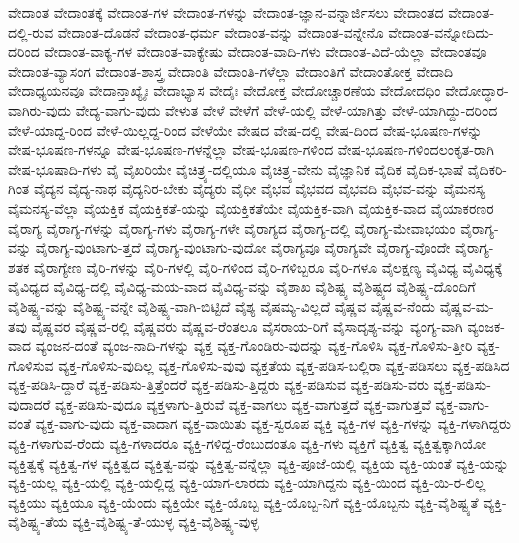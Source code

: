 {ವೇದಾಂತ
ವೇದಾಂತಕ್ಕೆ
ವೇದಾಂತ-ಗಳ
ವೇದಾಂತ-ಗಳನ್ನು
ವೇದಾಂತ-ಜ್ಞಾನ-ವನ್ನಾರ್ಜಿಸಲು
ವೇದಾಂತದ
ವೇದಾಂತ-ದಲ್ಲಿ-ರುವ
ವೇದಾಂತ-ದೊಡನೆ
ವೇದಾಂತ-ಧರ್ಮ
ವೇದಾಂತ-ವನ್ನು
ವೇದಾಂತ-ವನ್ನೇನೊ
ವೇದಾಂತ-ವನ್ನೋದಿದು-ದರಿಂದ
ವೇದಾಂತ-ವಾಕ್ಯ-ಗಳ
ವೇದಾಂತ-ವಾಕ್ಯೇಷು
ವೇದಾಂತ-ವಾದಿ-ಗಳು
ವೇದಾಂತ-ವಿದೆ-ಯೆಲ್ಲಾ
ವೇದಾಂತವೂ
ವೇದಾಂತ-ವ್ಯಾಸಂಗ
ವೇದಾಂತ-ಶಾಸ್ತ್ರ
ವೇದಾಂತಿ
ವೇದಾಂತಿ-ಗಳೆಲ್ಲಾ
ವೇದಾಂತಿಗೆ
ವೇದಾಂತೋಕ್ತ
ವೇದಾದಿ
ವೇದಾಧ್ಯಯನವೂ
ವೇದಾನ್ತಾಖ್ಯೈಃ
ವೇದಾಭ್ಯಾಸ
ವೇದೈಃ
ವೇದೋಕ್ತ
ವೇದೋಚ್ಚಾರಣೆಯ
ವೇದೋದಧಿಂ
ವೇದೋದ್ಧಾರ-ವಾಗಿರು-ವುದು
ವೇದ್ಯ-ವಾಗು-ವುದು
ವೇಳುತ
ವೇಳೆ
ವೇಳೆಗೆ
ವೇಳೆ-ಯಲ್ಲಿ
ವೇಳೆ-ಯಾಗಿತ್ತು
ವೇಳೆ-ಯಾಗಿದ್ದು-ದರಿಂದ
ವೇಳೆ-ಯಾದ್ದ-ರಿಂದ
ವೇಳೆ-ಯಿಲ್ಲದ್ದ-ರಿಂದ
ವೇಳೆಯೇ
ವೇಷದ
ವೇಷ-ದಲ್ಲಿ
ವೇಷ-ದಿಂದ
ವೇಷ-ಭೂಷಣ-ಗಳನ್ನು
ವೇಷ-ಭೂಷಣ-ಗಳನ್ನೂ
ವೇಷ-ಭೂಷಣ-ಗಳನ್ನೆಲ್ಲಾ
ವೇಷ-ಭೂಷಣ-ಗಳಿಂದ
ವೇಷ-ಭೂಷಣ-ಗಳಿಂದಲಂಕೃತ-ರಾಗಿ
ವೇಷ-ಭೂಷಾದಿ-ಗಳು
ವೈ
ವೈಖರಿಯೇ
ವೈಚಿತ್ರ್ಯ-ದಲ್ಲಿಯೂ
ವೈಚಿತ್ರ್ಯ-ವೇನು
ವೈಜ್ಞಾನಿಕ
ವೈದಿಕ
ವೈದಿಕ-ಭಾಷೆ
ವೈದಿಕರಿ-ಗಿಂತ
ವೈದ್ಯನ
ವೈದ್ಯ-ನಾಥ
ವೈದ್ಯನಿರ-ಬೇಕು
ವೈದ್ಯರು
ವೈಧೀ
ವೈಭವ
ವೈಭವದ
ವೈಭವದಿ
ವೈಭವ-ವನ್ನು
ವೈಮನಸ್ಯ
ವೈಮನಸ್ಯ-ವೆಲ್ಲಾ
ವೈಯಕ್ತಿಕ
ವೈಯಕ್ತಿಕತೆ-ಯನ್ನು
ವೈಯಕ್ತಿಕತೆಯೇ
ವೈಯಕ್ತಿಕ-ವಾಗಿ
ವೈಯಕ್ತಿಕ-ವಾದ
ವೈಯಾಕರಣರ
ವೈರಾಗ್ಯ
ವೈರಾಗ್ಯ-ಗಳನ್ನು
ವೈರಾಗ್ಯ-ಗಳು
ವೈರಾಗ್ಯ-ಗಳೇ
ವೈರಾಗ್ಯದ
ವೈರಾಗ್ಯ-ದಲ್ಲಿ
ವೈರಾಗ್ಯ-ಮೇವಾಭಯಂ
ವೈರಾಗ್ಯ-ವನ್ನು
ವೈರಾಗ್ಯ-ವುಂಟಾಗು-ತ್ತದೆ
ವೈರಾಗ್ಯ-ವುಂಟಾಗು-ವುದೋ
ವೈರಾಗ್ಯವೂ
ವೈರಾಗ್ಯವೇ
ವೈರಾಗ್ಯ-ವೊಂದೇ
ವೈರಾಗ್ಯ-ಶತಕ
ವೈರಾಗ್ಯೇಣ
ವೈರಿ-ಗಳನ್ನು
ವೈರಿ-ಗಳಲ್ಲಿ
ವೈರಿ-ಗಳಿಂದ
ವೈರಿ-ಗಳಿಬ್ಬರೂ
ವೈರಿ-ಗಳೂ
ವೈಲಕ್ಷಣ್ಯ
ವೈವಿಧ್ಯ
ವೈವಿಧ್ಯಕ್ಕೆ
ವೈವಿಧ್ಯದ
ವೈವಿಧ್ಯ-ದಲ್ಲಿ
ವೈವಿಧ್ಯ-ಮಯ-ವಾದ
ವೈವಿಧ್ಯ-ವನ್ನು
ವೈಶಾಖ
ವೈಶಿಷ್ಟ್ಯ
ವೈಶಿಷ್ಟ್ಯದ
ವೈಶಿಷ್ಟ್ಯ-ದೊಂದಿಗೆ
ವೈಶಿಷ್ಟ್ಯ-ವನ್ನು
ವೈಶಿಷ್ಟ್ಯ-ವನ್ನೇ
ವೈಶಿಷ್ಟ್ಯ-ವಾಗಿ-ಬಿಟ್ಟಿದೆ
ವೈಶ್ಯ
ವೈಷಮ್ಯ-ವಿಲ್ಲದೆ
ವೈಷ್ಣವ
ವೈಷ್ಣವ-ನೆಂದು
ವೈಷ್ಣವ-ಮ-ತವು
ವೈಷ್ಣವರ
ವೈಷ್ಣವ-ರಲ್ಲಿ
ವೈಷ್ಣವರು
ವೈಷ್ಣವ-ರೆಂತಲೂ
ವೈಸರಾಯ-ರಿಗೆ
ವೈಸಾದೃಶ್ಯ-ವನ್ನು
ವ್ಯಂಗ್ಯ-ವಾಗಿ
ವ್ಯಂಜಕ-ವಾದ
ವ್ಯಂಜನ-ದಂತೆ
ವ್ಯಂಜ-ನಾದಿ-ಗಳನ್ನು
ವ್ಯಕ್ತ
ವ್ಯಕ್ತ-ಗೊಂಡಿರು-ವುದನ್ನು
ವ್ಯಕ್ತ-ಗೊಳಿಸಿ
ವ್ಯಕ್ತ-ಗೊಳಿಸು-ತ್ತೀರಿ
ವ್ಯಕ್ತ-ಗೊಳಿಸುವ
ವ್ಯಕ್ತ-ಗೊಳಿಸು-ವುದಿಲ್ಲ
ವ್ಯಕ್ತ-ಗೊಳಿಸು-ವುವು
ವ್ಯಕ್ತತೆಯ
ವ್ಯಕ್ತ-ಪಡಿಸ-ಬಲ್ಲಿರಾ
ವ್ಯಕ್ತ-ಪಡಿಸಲು
ವ್ಯಕ್ತ-ಪಡಿಸಿದ
ವ್ಯಕ್ತ-ಪಡಿಸಿ-ದ್ದಾರೆ
ವ್ಯಕ್ತ-ಪಡಿಸು-ತ್ತಿತ್ತೆಂದರೆ
ವ್ಯಕ್ತ-ಪಡಿಸು-ತ್ತಿದ್ದರು
ವ್ಯಕ್ತ-ಪಡಿಸುವ
ವ್ಯಕ್ತ-ಪಡಿಸು-ವರು
ವ್ಯಕ್ತ-ಪಡಿಸು-ವುದಾದರೆ
ವ್ಯಕ್ತ-ಪಡಿಸು-ವುದೂ
ವ್ಯಕ್ತಳಾಗು-ತ್ತಿರುವೆ
ವ್ಯಕ್ತ-ವಾಗಲು
ವ್ಯಕ್ತ-ವಾಗುತ್ತದೆ
ವ್ಯಕ್ತ-ವಾಗುತ್ತವೆ
ವ್ಯಕ್ತ-ವಾಗು-ವಂತೆ
ವ್ಯಕ್ತ-ವಾಗು-ವುದು
ವ್ಯಕ್ತ-ವಾದಾಗ
ವ್ಯಕ್ತ-ವಾಯಿತು
ವ್ಯಕ್ತ-ಸ್ವರೂಪ
ವ್ಯಕ್ತಿ
ವ್ಯಕ್ತಿ-ಗಳ
ವ್ಯಕ್ತಿ-ಗಳನ್ನು
ವ್ಯಕ್ತಿ-ಗಳಾಗಿದ್ದರು
ವ್ಯಕ್ತಿ-ಗಳಾಗುವ-ರೆಂದು
ವ್ಯಕ್ತಿ-ಗಳಾದರೂ
ವ್ಯಕ್ತಿ-ಗಳಿದ್ದ-ರೆಂಬುದಂತೂ
ವ್ಯಕ್ತಿ-ಗಳು
ವ್ಯಕ್ತಿಗೆ
ವ್ಯಕ್ತಿತ್ವ
ವ್ಯಕ್ತಿತ್ವಕ್ಕಾಗಿಯೋ
ವ್ಯಕ್ತಿತ್ವಕ್ಕೆ
ವ್ಯಕ್ತಿತ್ವ-ಗಳ
ವ್ಯಕ್ತಿತ್ವದ
ವ್ಯಕ್ತಿತ್ವ-ವನ್ನು
ವ್ಯಕ್ತಿತ್ವ-ವನ್ನೆಲ್ಲಾ
ವ್ಯಕ್ತಿ-ಪೂಜೆ-ಯಲ್ಲಿ
ವ್ಯಕ್ತಿಯ
ವ್ಯಕ್ತಿ-ಯಂತೆ
ವ್ಯಕ್ತಿ-ಯನ್ನು
ವ್ಯಕ್ತಿ-ಯಲ್ಲ
ವ್ಯಕ್ತಿ-ಯಲ್ಲಿ
ವ್ಯಕ್ತಿ-ಯಲ್ಲಿದ್ದ
ವ್ಯಕ್ತಿ-ಯಾಗ-ಲಾರದು
ವ್ಯಕ್ತಿ-ಯಾಗಿದ್ದನು
ವ್ಯಕ್ತಿ-ಯಿಂದ
ವ್ಯಕ್ತಿ-ಯಿ-ರ-ಲಿಲ್ಲ
ವ್ಯಕ್ತಿಯು
ವ್ಯಕ್ತಿಯೂ
ವ್ಯಕ್ತಿ-ಯೆಂದು
ವ್ಯಕ್ತಿಯೇ
ವ್ಯಕ್ತಿ-ಯೊಬ್ಬ
ವ್ಯಕ್ತಿ-ಯೊಬ್ಬ-ನಿಗೆ
ವ್ಯಕ್ತಿ-ಯೊಬ್ಬನು
ವ್ಯಕ್ತಿ-ವೈಶಿಷ್ಟ್ಯತೆ
ವ್ಯಕ್ತಿ-ವೈಶಿಷ್ಟ್ಯ-ತೆಯ
ವ್ಯಕ್ತಿ-ವೈಶಿಷ್ಟ್ಯ-ತೆ-ಯುಳ್ಳ
ವ್ಯಕ್ತಿ-ವೈಶಿಷ್ಟ್ಯ-ವುಳ್ಳ
}
